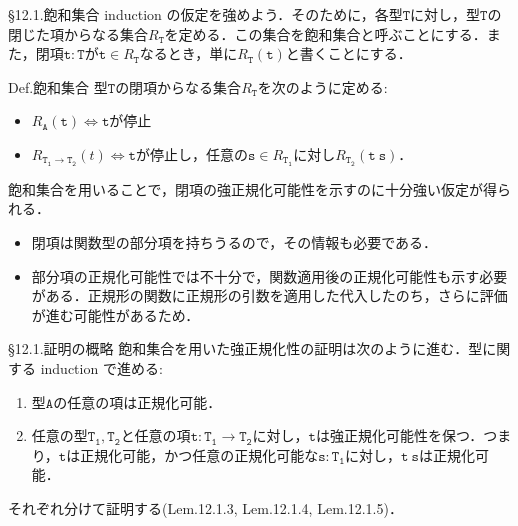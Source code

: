 \documentclass[9pt]{beamer}
\begin{document}
\begin{frame}{\S12.1.飽和集合}
induction の仮定を強めよう．そのために，各型$\mathtt{T}$に対し，型$\mathtt{T}$の閉じた項からなる集合$R_{\mathtt{T}}$を定める．この集合を飽和集合と呼ぶことにする．また，閉項$\mathtt{t:T}$が$\mathtt{t}\in R_{\mathtt{T}}$なるとき，単に$R_{\mathtt{T}}(\mathtt{t})$と書くことにする．
\begin{alertblock}{Def.飽和集合}
型$\mathtt{T}$の閉項からなる集合$R_{\mathtt{T}}$を次のように定める:\begin{itemize}
\item $R_{\mathtt{A}}(\mathtt{t})\Leftrightarrow\mathtt{t}$が停止
\item $R_{\mathtt{T_{1}\to T_{2}}}(t)\Leftrightarrow\mathtt{t}$が停止し，任意の$\mathtt{s}\in R_{\mathtt{T_{1}}}$に対し$R_{\mathtt{T_{2}}}(\mathtt{t\ s})$．
\end{itemize}
\end{alertblock}
飽和集合を用いることで，閉項の強正規化可能性を示すのに十分強い仮定が得られる．\begin{itemize}
\item 閉項は関数型の部分項を持ちうるので，その情報も必要である．
\item 部分項の正規化可能性では不十分で，関数適用後の正規化可能性も示す必要がある．正規形の関数に正規形の引数を適用した代入したのち，さらに評価が進む可能性があるため．
\end{itemize}
\end{frame}
\begin{frame}{\S12.1.証明の概略}
飽和集合を用いた強正規化性の証明は次のように進む．型に関する induction で進める:\begin{enumerate}
\item 型$\mathtt{A}$の任意の項は正規化可能．
                                                                                  \item 任意の型$\mathtt{T_{1}, T_{2}}$と任意の項$\mathtt{t:T_{1}\to T_{2}}$に対し，$\mathtt{t}$は強正規化可能性を保つ．つまり，$\mathtt{t}$は正規化可能，かつ任意の正規化可能な$\mathtt{s:T_{1}}$に対し，$\mathtt{t\ s}$は正規化可能．
\end{enumerate}
それぞれ分けて証明する(Lem.12.1.3, Lem.12.1.4, Lem.12.1.5)．
\end{frame}
\end{document}
